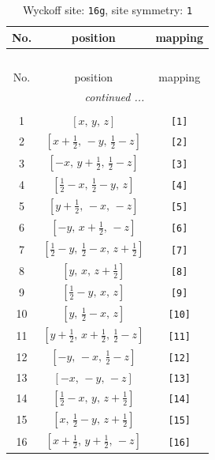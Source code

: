 \documentclass[fleqn,8pt]{jsarticle}
\begin{document}
\begin{longtable}{ccc}
\caption{Wyckoff site: {\tt 16g}, site symmetry: {\tt 1}}
 \\
 \hline \hline
No. & position & mapping \\ \hline \endfirsthead

\multicolumn{2}{l}{\tablename\ \thetable{}} \\
 \hline \hline
No. & position & mapping \\ \hline \endhead

 \hline \hline
\multicolumn{2}{r}{\footnotesize\it continued ...} \\ \endfoot

 \hline \hline
\multicolumn{2}{r}{} \\ \endlastfoot

1 & $\left[ x,\, y,\, z \right]$ & {\tt [1]} \\ \hline
2 & $\left[ x + \frac{1}{2},\, - y,\, \frac{1}{2} - z \right]$ & {\tt [2]} \\ \hline
3 & $\left[ - x,\, y + \frac{1}{2},\, \frac{1}{2} - z \right]$ & {\tt [3]} \\ \hline
4 & $\left[ \frac{1}{2} - x,\, \frac{1}{2} - y,\, z \right]$ & {\tt [4]} \\ \hline
5 & $\left[ y + \frac{1}{2},\, - x,\, - z \right]$ & {\tt [5]} \\ \hline
6 & $\left[ - y,\, x + \frac{1}{2},\, - z \right]$ & {\tt [6]} \\ \hline
7 & $\left[ \frac{1}{2} - y,\, \frac{1}{2} - x,\, z + \frac{1}{2} \right]$ & {\tt [7]} \\ \hline
8 & $\left[ y,\, x,\, z + \frac{1}{2} \right]$ & {\tt [8]} \\ \hline
9 & $\left[ \frac{1}{2} - y,\, x,\, z \right]$ & {\tt [9]} \\ \hline
10 & $\left[ y,\, \frac{1}{2} - x,\, z \right]$ & {\tt [10]} \\ \hline
11 & $\left[ y + \frac{1}{2},\, x + \frac{1}{2},\, \frac{1}{2} - z \right]$ & {\tt [11]} \\ \hline
12 & $\left[ - y,\, - x,\, \frac{1}{2} - z \right]$ & {\tt [12]} \\ \hline
13 & $\left[ - x,\, - y,\, - z \right]$ & {\tt [13]} \\ \hline
14 & $\left[ \frac{1}{2} - x,\, y,\, z + \frac{1}{2} \right]$ & {\tt [14]} \\ \hline
15 & $\left[ x,\, \frac{1}{2} - y,\, z + \frac{1}{2} \right]$ & {\tt [15]} \\ \hline
16 & $\left[ x + \frac{1}{2},\, y + \frac{1}{2},\, - z \right]$ & {\tt [16]} \\
\end{longtable}
\end{document}
